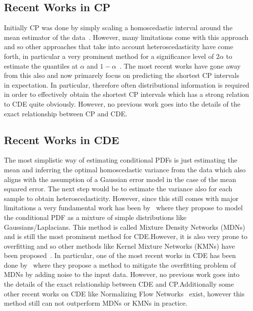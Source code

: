\subsection{Recent Works in CP}

Initially CP was done by simply scaling a homoscedastic interval around the mean estimator of the data~\cite{lei2018distribution}. However, many limitations come with this approach and so other approaches that take into account heteroscedasticity have come forth, in particular a very prominent method for a significance level of $2 \alpha$ to estimate the quantiles at $\alpha$ and $1 - \alpha$~\cite{romano2019conformalized}. The most recent works have gone away from this also and now primarely focus on predicting the shortest CP intervals~\cite{sesia2021conformal,chernozhukov2021distributional,izbicki2022cd} in expectation. In particular, therefore often distributional information is required in order to effectively obtain the shortest CP intervals which has a strong relation to CDE quite obviously. However, no previous work goes into the details of the exact relationship between CP and CDE.\@

\subsection{Recent Works in CDE}

The most simplistic way of estimating conditional PDFs is just estimating the mean and inferring the optimal homoscedastic variance from the data which also aligns with the assumption of a Gaussian error model in the case of the mean squared error. The next step would be to estimate the variance also for each sample to obtain heteroscedasticity. However, since this still comes with major limitations a very fundamental work has been by~\cite{bishop1994mixture} where they propose to model the conditional PDF as a mixture of simple distributions like Gaussians/Laplacians. This method is called Mixture Density Networks (MDNs) and is still the most prominent method for CDE.\@ However, it is also very prone to overfitting and so other methods like Kernel Mixture Networks (KMNs) have been proposed~\cite{ambrogioni2017kernel}. In particular, one of the most recent works in CDE has been done by~\cite{rothfuss2019noise} where they propose a method to mitigate the overfitting problem of MDNs by adding noise to the input data. However, no previous work goes into the details of the exact relationship between CDE and CP.\@ Additionally some other recent works on CDE like Normalizing Flow Networks~\cite{trippe2018conditional} exist, however this method still can not outperform MDNs or KMNs in practice.

